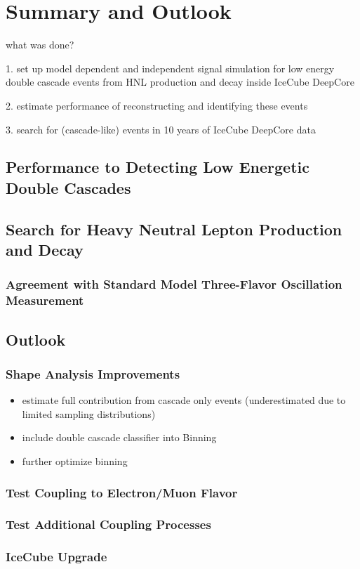 \setchapterpreamble[u]{\margintoc}

\chapter{Summary and Outlook}

what was done?

1. set up model dependent and independent signal simulation for low energy double cascade events from HNL production and decay inside IceCube DeepCore

2. estimate performance of reconstructing and identifying these events

3. search for (cascade-like) events in 10 years of IceCube DeepCore data


\section{Performance to Detecting Low Energetic Double Cascades}


\section{Search for Heavy Neutral Lepton Production and Decay}

\subsection{Agreement with Standard Model Three-Flavor Oscillation Measurement}


\section{Outlook}

\subsection{Shape Analysis Improvements}

\begin{itemize}
    \item estimate full contribution from cascade only events (underestimated due to limited sampling distributions)
    \item include double cascade classifier into Binning
    \item further optimize binning
\end{itemize}

\subsection{Test Coupling to Electron/Muon Flavor}

\subsection{Test Additional Coupling Processes}

\subsection{IceCube Upgrade}
